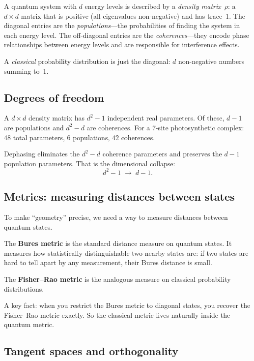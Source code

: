 \documentclass[11pt,a4paper]{article}
\begin{document}
A quantum system with $d$ energy levels is described by a \emph{density matrix}~$\rho$: a $d \times d$ matrix that is positive (all eigenvalues non-negative) and has trace~1.  The diagonal entries are the \emph{populations}---the probabilities of finding the system in each energy level.  The off-diagonal entries are the \emph{coherences}---they encode phase relationships between energy levels and are responsible for interference effects.

A \emph{classical} probability distribution is just the diagonal: $d$ non-negative numbers summing to~1.

\subsection*{Degrees of freedom}

A $d \times d$ density matrix has $d^2 - 1$ independent real parameters.  Of these, $d - 1$ are populations and $d^2 - d$ are coherences.  For a 7-site photosynthetic complex: 48 total parameters, 6 populations, 42 coherences.

Dephasing eliminates the $d^2 - d$ coherence parameters and preserves the $d - 1$ population parameters.  That is the dimensional collapse:
\[
d^2 - 1 \;\longrightarrow\; d - 1.
\]

\subsection*{Metrics: measuring distances between states}

To make ``geometry'' precise, we need a way to measure distances between quantum states.

The \textbf{Bures metric} is the standard distance measure on quantum states.  It measures how statistically distinguishable two nearby states are: if two states are hard to tell apart by any measurement, their Bures distance is small.

The \textbf{Fisher--Rao metric} is the analogous measure on classical probability distributions.

A key fact: when you restrict the Bures metric to diagonal states, you recover the Fisher--Rao metric exactly.  So the classical metric lives naturally inside the quantum metric.

\subsection*{Tangent spaces and orthogonality}
\end{document}
